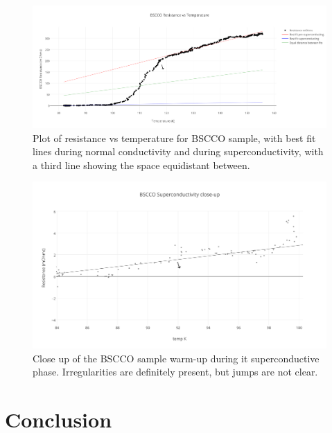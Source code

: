 \documentclass[prb,preprint]{revtex4-1}
\begin{document}
\begin{figure}[width=10mm][h!]
\centering
\includegraphics{bscco_resistance_vs_temperature.png}
\caption{Plot of resistance vs temperature for BSCCO sample, with best fit lines during normal conductivity and during superconductivity, with a third line showing the space equidistant between.}
\label{BSCCOplot1}
\end{figure}

\begin{figure}[width=3in][h!]
\centering
\includegraphics{bscco_superconductivity_close-up.png}
\caption{Close up of the BSCCO sample warm-up during it superconductive phase. Irregularities are definitely present, but jumps are not clear.}
\label{BSCCOplot2}
\end{figure}

\section{Conclusion}
\end{document}
